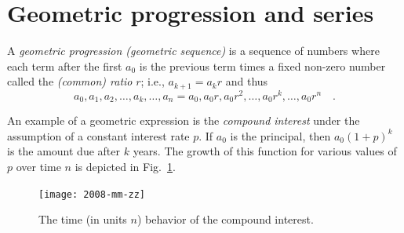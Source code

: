 \documentclass[aps,rmp,preprint,amsfonts,showpacs,showkeys]{revtex4}
\begin{document}
\appendix

\section{Geometric progression and series}
\label{Geometric progression and series}


A {\em geometric progression (geometric sequence)}
is a sequence of numbers
where each term after the first $a_0$ is  the previous term
times a fixed non-zero number called the {\em (common) ratio} $r$; i.e., $a_{k+1}= a_k r$ and thus
$$a_0, a_1, a_2,  \ldots ,a_k, \ldots ,a_n= a_0, a_0r, a_0r^2, \ldots ,a_0r^k, \ldots ,a_0r^n\quad .$$

An example of a geometric expression is the {\em compound interest} under the assumption of a constant interest rate $p$.
If $a_0$ is the principal, then $a_0(1+p)^k$ is the amount due after $k$ years.
The growth of this function for various values of $p$  over time $n$ is depicted in Fig.~\ref{2008-mm-zz}.
\begin{figure}
\begin{center}
 \texttt{[image: 2008-mm-zz]}
\end{center}
\caption{The time (in units $n$) behavior of the compound interest.}
\label{2008-mm-zz}
\end{figure}
\end{document}
